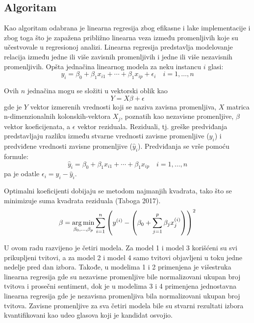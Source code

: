 \subsection{Algoritam}

Kao algoritam odabrana je linearna regresija zbog efikasne i lake implementacije i zbog toga što je zapažena približno linearna veza između promenljivih koje su učestvovale u regresionoj analizi. Linearna regresija predstavlja modelovanje relacija između jedne ili više zavisnih promenljivih i jedne ili više nezavisnih promenljivih. Opšta jednačina linearnog modela za neku instancu $i$ glasi:
\begin{equation*}
    y_i = \beta_0 + \beta_1 x_{i1} + \cdots + \beta_1 x_{ip} + \epsilon_i \quad i = 1, \dots, n
\end{equation*}

Ovih $n$ jednačina mogu se složiti u vektorski oblik kao
\begin{equation*}
    Y = X\beta + \epsilon
\end{equation*}
gde je $Y$ vektor izmerenih vrednosti koji se naziva zavisna promenljiva, $X$ matrica n-dimenzionalnih kolonskih-vektora $X_j$, poznatih kao nezavisne promenljive, $\beta$ vektor koeficijenata, a $\epsilon$ vektor reziduala. Reziduali, tj. greške predviđanja predstavljaju razliku između stvarne vrednosti zavisne promenljive ($y_i$) i predviđene vrednosti zavisne promenljive ($\hat{y}_i$). Predviđanja se vrše pomoću formule:
\begin{equation*}
    \hat{y}_i = \beta_0 + \beta_1 x_{i1} + \cdots + \beta_1 x_{ip} \quad i = 1, \dots, n
\end{equation*}
pa je odatle $\epsilon_i = y_i - \hat{y}_i$.

Optimalni koeficijenti dobijaju se metodom najmanjih kvadrata, tako što se minimizuje suma kvadrata reziduala (Taboga 2017).
\begin{equation*}
    \beta = \operatorname*{arg\,min}_{\beta_0,\dots,\beta_p} \sum^n_{i=1} \left(
        y^{(i)} - \left(
            \beta_0 + \sum^p_{j=1} \beta_j x^{(i)}_j
        \right)
    \right)^2
\end{equation*}

U ovom radu razvijeno je četiri modela. Za model 1 i model 3 korišćeni su svi prikupljeni tvitovi, a za model 2 i model 4 samo tvitovi objavljeni u toku jedne nedelje pred dan izbora. Takođe, u modelima 1 i 2 primenjena je višestruka linearna regresija gde su nezavisne promenljive bile normalizovani ukupan broj tvitova i prosečni sentiment, dok je u modelima 3 i 4 primenjena jednostavna linearna regresija gde je nezavisna promenljiva bila normalizovani ukupan broj tvitova. Zavisne promenljive za sva četiri modela bile su stvarni rezultati izbora kvantifikovani kao udeo glasova koji je kandidat osvojio.

